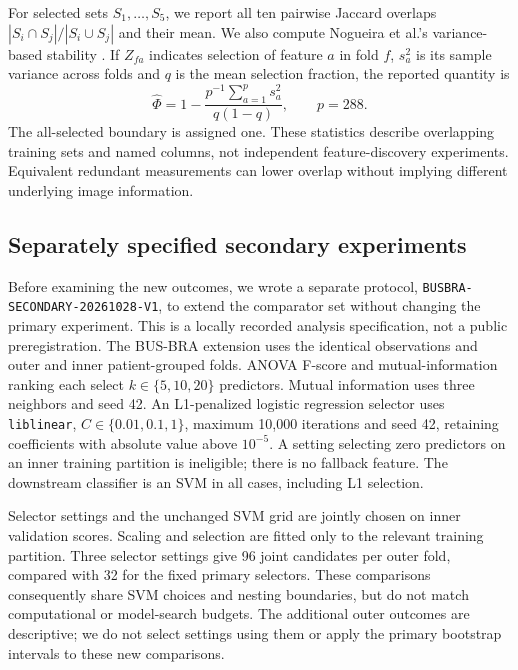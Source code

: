 \documentclass[11pt,a4paper]{article}
\begin{document}
For selected sets $S_1,\ldots,S_5$, we report all ten pairwise Jaccard overlaps $|S_i\cap S_j|/|S_i\cup S_j|$ and their mean. We also compute Nogueira et al.'s variance-based stability \cite{nogueira}. If $Z_{fa}$ indicates selection of feature $a$ in fold $f$, $s_a^2$ is its sample variance across folds and $q$ is the mean selection fraction, the reported quantity is
\begin{equation}
 \widehat{\Phi}=1-\frac{p^{-1}\sum_{a=1}^{p}s_a^2}{q(1-q)},\qquad p=288.
\end{equation}
The all-selected boundary is assigned one. These statistics describe overlapping training sets and named columns, not independent feature-discovery experiments. Equivalent redundant measurements can lower overlap without implying different underlying image information.


\subsection{Separately specified secondary experiments}\label{sec:secondary}
Before examining the new outcomes, we wrote a separate protocol, \texttt{BUSBRA-SECONDARY-}\allowbreak\texttt{20261028-V1}, to extend the comparator set without changing the primary experiment. This is a locally recorded analysis specification, not a public preregistration. The BUS-BRA extension uses the identical observations and outer and inner patient-grouped folds. ANOVA F-score and mutual-information ranking each select $k\in\{5,10,20\}$ predictors. Mutual information uses three neighbors and seed 42. An L1-penalized logistic regression selector uses \texttt{liblinear}, $C\in\{0.01,0.1,1\}$, maximum 10,000 iterations and seed 42, retaining coefficients with absolute value above $10^{-5}$. A setting selecting zero predictors on an inner training partition is ineligible; there is no fallback feature. The downstream classifier is an SVM in all cases, including L1 selection.

Selector settings and the unchanged SVM grid are jointly chosen on inner validation scores. Scaling and selection are fitted only to the relevant training partition. Three selector settings give 96 joint candidates per outer fold, compared with 32 for the fixed primary selectors. These comparisons consequently share SVM choices and nesting boundaries, but do not match computational or model-search budgets. The additional outer outcomes are descriptive; we do not select settings using them or apply the primary bootstrap intervals to these new comparisons.
\end{document}
